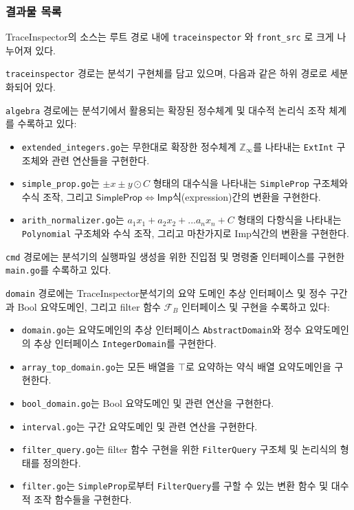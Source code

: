 \documentclass[a4paper,12pt]{article}
\newcommand{\imp}{\textsf{Imp}}
\newcommand{\traceinspector}{\textsf{TraceInspector}}
\begin{document}
\subsubsection{결과물 목록} \label{artifact}

\traceinspector 의 소스는 루트 경로 내에 \verb|traceinspector| 와 \verb|front_src| 로 크게 나누어져 있다.

\verb|traceinspector| 경로는 분석기 구현체를 담고 있으며, 다음과 같은 하위 경로로 세분화되어 있다.

\verb|algebra| 경로에는 분석기에서 활용되는 확장된 정수체계 및 대수적 논리식 조작 체계를 수록하고 있다:
\begin{itemize}
    \item \verb|extended_integers.go|는 무한대로 확장한 정수체계 $\mathbb{Z}_{\infty}$를 나타내는 \verb|ExtInt| 구조체와 관련 연산들을 구현한다.
    \item \verb|simple_prop.go|는 $\pm x \pm y \odot C$ 형태의 대수식을 나타내는 \verb|SimpleProp| 구조체와 수식 조작, 그리고 $\mathsf{SimpleProp} \Leftrightarrow \mathsf{Imp}$식(expression)간의 변환을 구현한다.
    \item \verb|arith_normalizer.go|는 $a_1 x_1 + a_2 x_2 +  ... a_n x_n + C $ 형태의 다항식을 나타내는 \verb|Polynomial| 구조체와 수식 조작, 그리고 마찬가지로 \imp 식간의 변환을 구현한다.
\end{itemize}

\verb|cmd| 경로에는 분석기의 실행파일 생성을 위한 진입점 및 명령줄 인터페이스를 구현한 \verb|main.go|를 수록하고 있다.

\verb|domain| 경로에는 \traceinspector 분석기의 요약 도메인 추상 인터페이스 및 정수 구간과 Bool 요약도메인, 그리고 filter 함수 $\mathcal{F}_{B}$ 인터페이스 및 구현을 수록하고 있다:
\begin{itemize}
    \item \verb|domain.go|는 요약도메인의 추상 인터페이스 \verb|AbstractDomain|와 정수 요약도메인의 추상 인터페이스 \verb|IntegerDomain|를 구현한다.
    \item \verb|array_top_domain.go|는 모든 배열을 $\top$로 요약하는 약식 배열 요약도메인을 구현한다.
    \item \verb|bool_domain.go|는 Bool 요약도메인 및 관련 연산을 구현한다.
    \item \verb|interval.go|는 구간 요약도메인 및 관련 연산을 구현한다.
    \item \verb|filter_query.go|는 filter 함수 구현을 위한 \verb|FilterQuery| 구조체 및 논리식의 형태를 정의한다.
    \item \verb|filter.go|는 \verb|SimpleProp|로부터 \verb|FilterQuery|를 구할 수 있는 변환 함수 및 대수적 조작 함수들을 구현한다.
\end{itemize}
\end{document}
